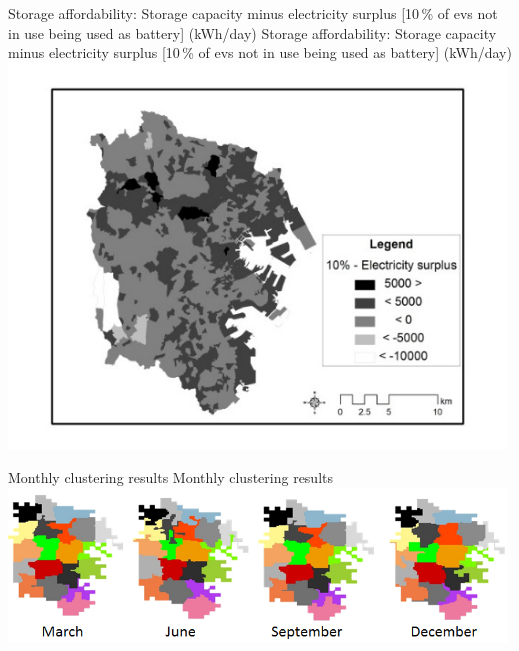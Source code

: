 \createfigure%
{Storage affordability: Storage capacity minus electricity surplus [10\,\% of \glspl{ev} not in use being used as battery] (kWh/day)}%
{Storage affordability: Storage capacity minus electricity surplus [10\,\% of \glspl{ev} not in use being used as battery] (kWh/day)}%
{\label{fig:yokohama_fig2}}%
{\includegraphics[width=0.99\textwidth, angle=0]{./scenarios/figures/yokohama_fig2.png}}%
{}

\createfigure%
{Monthly clustering results}%
{Monthly clustering results}%
{\label{fig:yokohama_fig3}}%
{\includegraphics[width=0.99\textwidth, angle=0]{./scenarios/figures/yokohama_fig3.png}}%
{}


